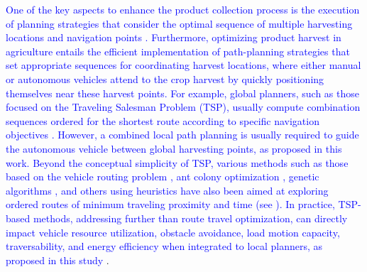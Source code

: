 \documentclass[conference]{IEEEtran}
\begin{document}
\textcolor{blue}{One of the key aspects to enhance the product collection process is the execution of planning strategies that consider the optimal sequence of multiple harvesting locations and navigation points \cite{GUEVARA2021, s21237898}. Furthermore, optimizing product harvest in agriculture entails the efficient implementation of path-planning strategies that set appropriate sequences for coordinating harvest locations, where either manual or autonomous vehicles attend to the crop harvest by quickly positioning themselves near these harvest points. For example, global planners, such as those focused on the Traveling Salesman Problem (TSP), usually compute combination sequences ordered for the shortest route according to specific navigation objectives \cite{9896838, GRAFPLESSEN201999}. However, a combined local path planning is usually required to guide the autonomous vehicle between global harvesting points, as proposed in this work. Beyond the conceptual simplicity of TSP, various methods such as those based on the vehicle routing problem \cite{HE2019387, 2034192}, ant colony optimization \cite{agriculture12070986, 12132}, genetic algorithms \cite{1729881420925310}, and others using heuristics have also been aimed at exploring ordered routes of minimum traveling proximity and time (see \cite[and their reference therein]{Yahia2023}). In practice, TSP-based methods, addressing further than route travel optimization, can directly impact vehicle resource utilization, obstacle avoidance, load motion capacity, traversability, and energy efficiency when integrated to local planners, as proposed in this study \cite{Planas, Janos2021}}. 
\end{document}
